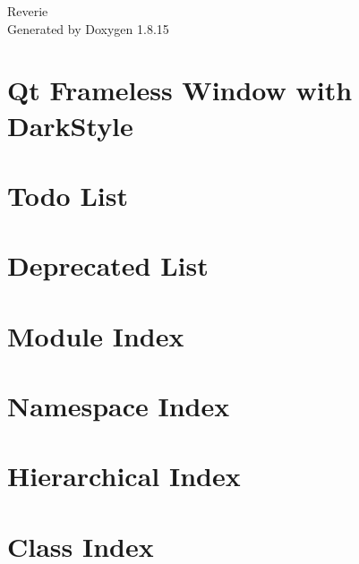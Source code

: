 \let\mypdfximage\pdfximage\def\pdfximage{\immediate\mypdfximage}\documentclass[twoside]{book}
\newcommand{\+}{\discretionary{\mbox{\scriptsize$\hookleftarrow$}}{}{}}
\newcommand{\clearemptydoublepage}{%
  \newpage{\pagestyle{empty}\cleardoublepage}%
}
\begin{document}
\hypersetup{pageanchor=false,
             bookmarksnumbered=true,
             pdfencoding=unicode
            }
\begin{titlepage}
\vspace*{7cm}
\begin{center}%
{\Large Reverie }\\
\vspace*{1cm}
{\large Generated by Doxygen 1.8.15}\\
\end{center}
\end{titlepage}
\clearemptydoublepage
{}
\tableofcontents
\clearemptydoublepage
{}
\hypersetup{pageanchor=true}

\chapter{Qt Frameless Window with Dark\+Style}
\label{md__c_1__users_dante__documents__projects_grand-blue-engine_reverie_src_view_style__r_e_a_d_m_e}

\chapter{Todo List}
\label{todo}

\chapter{Deprecated List}
\label{deprecated}

\chapter{Module Index}

\chapter{Namespace Index}

\chapter{Hierarchical Index}

\chapter{Class Index}

\end{document}
